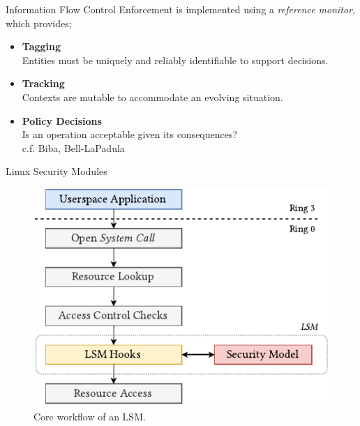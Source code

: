 \documentclass[xcolor=dvipsnames]{beamer}
\begin{document}
\begin{frame}{Information Flow Control}  
    Enforcement is implemented using a \textit{reference monitor}, which provides;
    \vspace{3mm}
    \begin{itemize}
        \item \textbf{Tagging} \\
        Entities must be uniquely and reliably identifiable to support decisions.
        \vspace{5mm}
        \item \textbf{Tracking} \\
        Contexts are mutable to accommodate an evolving situation.
        \vspace{5mm}
        \item \textbf{Policy Decisions} \\
        Is an operation acceptable given its consequences? \\
        c.f. Biba, Bell-LaPadula
    \end{itemize}
\end{frame}


\begin{frame}{Linux Security Modules}

    \begin{figure}[]
        \centering
        \includegraphics[width=0.6\linewidth]{../figures/LSM.pdf}
        \vspace{5mm}
        \caption{Core workflow of an LSM.}
        \label{fig:citadel-overview}
    \end{figure}

\end{frame}
\end{document}
